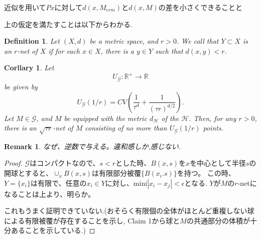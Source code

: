 \documentclass{jarticle}
\newtheorem{dfn}[thm]{Definition}
\newtheorem{cor}[thm]{Corllary}
\newtheorem*{rem}{Remark}
\begin{document}
近似を用いて$Px$に対して$d(x,M_{erm})$と$d(x,M)$の差を小さくできることと

上の仮定を満たすことは以下からわかる.

\begin{dfn}
 Let $(X,d)$ be a metric space, and $r > 0$. We call that $Y \subset X$ is an $r$-net of $X$
 if   for each $x \in X$, there is a $y \in Y$ such that $d(x,y) < r$.
\end{dfn}

\begin{cor}
\label{volumebound}
   Let
  \begin{equation*}
   U_{\mathcal{G}}:\mathbb{R}^{+} \to \mathbb{R}
  \end{equation*}
be given by
\begin{equation*}
 U_{\mathcal{G}}(1/r) = CV ( \frac{ 1 }{\tau^d }  + \frac{ 1 }{ (\tau r)^{d/2} }).
\end{equation*}
Let $M \in \mathcal{G}$, and $M$ be equipped with the metric $d_{\mathcal{H}}$ of the $\mathcal{H}$.
Then, for any $r >0$, there is an $\sqrt{\tau r}$-net of $M$ consisting of no more than $U_{\mathcal{G}}(1/r)$ points.
\end{cor}
\begin{rem}
 なぜ、逆数で与える。違和感しか,感じない.
\end{rem}

\begin{proof}
  $\mathcal{G}$はコンパクトなので、$ s < r$とした時、$B(x,s)$を$x$を中心として半径$s$の開球とすると、$\cup_x B(x,s)$は有限部分被覆$\{ B(x_i.s) \}$を持つ。
  この時、$Y=\{ x_i \}$は有限で、任意の$x_i \in Y$に対し、$\mathrm{mini}|x_ i -x_j| < \epsilon$となる.
  $Y$が$M$の$r$-netになることは上より、明らか。

これもうまく証明できていない.(おそらく有限個の全体がほとんど重複しない球による有限被覆が存在することを示し,
Claim 1から球と$M$の共通部分の体積が十分あることを示している.)
\end{proof}
\end{document}
